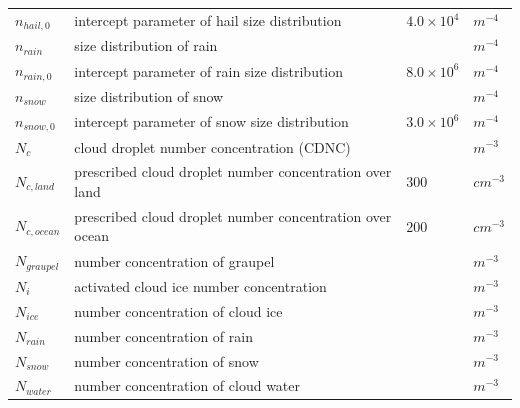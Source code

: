 \documentclass[letterpaper,titlepage,10pt]{article}
\numberwithin{equation}{section}
\begin{document}
\begin{appendices}
\begin{longtable}{p{}p{}p{}p{}}
    $n_{hail,0}$       & intercept parameter of hail size distribution                                        & $4.0 \times 10^{4}$        & $m^{-4}$ \\
    $n_{rain}$         & size distribution of rain                                                            &                            & $m^{-4}$ \\
    $n_{rain,0}$       & intercept parameter of rain size distribution                                        & $8.0 \times 10^{6}$        & $m^{-4}$ \\
    $n_{snow}$         & size distribution of snow                                                            &                            & $m^{-4}$ \\
    $n_{snow,0}$       & intercept parameter of snow size distribution                                        & $3.0 \times 10^{6}$        & $m^{-4}$ \\
	$N_c$              & cloud droplet number concentration (CDNC)                                            &                            & $m^{-3}$ \\
	$N_{c,land}$       & prescribed cloud droplet number concentration over land                              & $300$                      & $cm^{-3}$ \\
	$N_{c,ocean}$      & prescribed cloud droplet number concentration over ocean                             & $200$                      & $cm^{-3}$ \\
	$N_{graupel}$      & number concentration of graupel                                                      &                            & $m^{-3}$ \\
	$N_i$              & activated cloud ice number concentration                                             &                            & $m^{-3}$ \\
	$N_{ice}$          & number concentration of cloud ice                                                    &                            & $m^{-3}$ \\
	$N_{rain}$         & number concentration of rain                                                         &                            & $m^{-3}$ \\
	$N_{snow}$         & number concentration of snow                                                         &                            & $m^{-3}$ \\
	$N_{water}$        & number concentration of cloud water                                                  &                            & $m^{-3}$ \\

\end{longtable}
\end{appendices}
\end{document}
